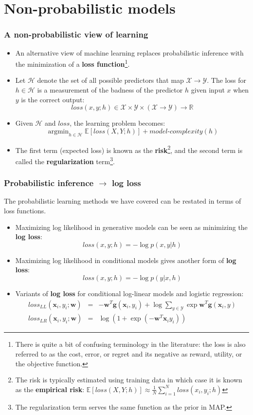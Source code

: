 \documentclass[ignorenonframetext,plain,fleqn]{beamer}
\DeclareMathOperator*{\argmin}{argmin}
\newcommand{\loss}{\mathit{loss}}
\renewcommand{\vec}{\mathbf}
\begin{document}
\section{Non-probabilistic models}
\frame{\sectionpage}

\begin{frame}\frametitle{A non-probabilistic view of learning} %
\begin{itemize}
\item An alternative view of machine learning replaces probabilistic
  inference with the minimization of a {\bf loss
    function}\footnote{There is quite a bit of confusing terminology
    in the literature: the loss is also referred to as the cost,
    error, or regret and its negative as reward, utility, or the
    objective function.}.
\item Let $\mathcal{H}$ denote the set of all possible predictors that
  map $\mathcal{X}\rightarrow\mathcal{Y}$.  The loss for
  $h\in\mathcal{H}$ is a measurement of the badness of the predictor
  $h$ given input $x$ when $y$ is the correct output:
  \[ \loss(x, y; h) \in \mathcal{X} \times \mathcal{Y}
  \times (\mathcal{X}\rightarrow\mathcal{Y}) \rightarrow \mathbb{R}
\]
\item Given $\mathcal{H}$ and $\loss$, the learning problem becomes:\[
  \argmin_{h\in\mathcal{H}} \mathbb{E}[\loss(X, Y; h)] +
  \textit{model-complexity}(h)
\]
\item The first term (expected loss) is known as the {\bf
  risk}\footnote{The risk is typically estimated using training data
  in which case it is known as the {\bf empirical risk}:
  $\mathbb{E}[\loss(X, Y; h)] \approx \frac{1}{N} \sum_{i=1}^N
  \loss(x_i, y_i; h)$ }, and the second term is called the {\bf
  regularization} term\footnote{The regularization term serves the
  same function as the prior in MAP.}.
\end{itemize}
\end{frame}

\begin{frame}\frametitle{Probabilistic inference $\rightarrow$ log loss}
The probabilistic learning methods we have covered can be restated in
terms of loss functions.
\begin{itemize}
\item Maximizing log likelihood in generative models can be seen as
  minimizing the {\bf log loss}:\[
\loss(x, y; h) = -\log p(x, y | h)
\]
\item Maximizing log likelihood in conditional models gives another
  form of {\bf log loss}:\[
\loss(x, y; h) = -\log p(y | x, h)
\]
\item Variants of {\bf log loss} for conditional log-linear models and
  logistic regression: \begin{eqnarray*}
\loss_{LL}(\vec{x}_i, y_i; \vec{w}) &=& 
-\vec{w}^T \vec{g}(\vec{x}_i,y_i) 
+\log \sum_{y\in\mathcal{Y}} \exp \vec{w}^T \vec{g}(\vec{x}_i,y) \\
\loss_{LR}(\vec{x}_i, y_i; \vec{w}) &=& \log(1 + \exp(-\vec{w}^T\vec{x}_i y_i))
\end{eqnarray*}
\end{itemize}
\end{frame}
\end{document}
